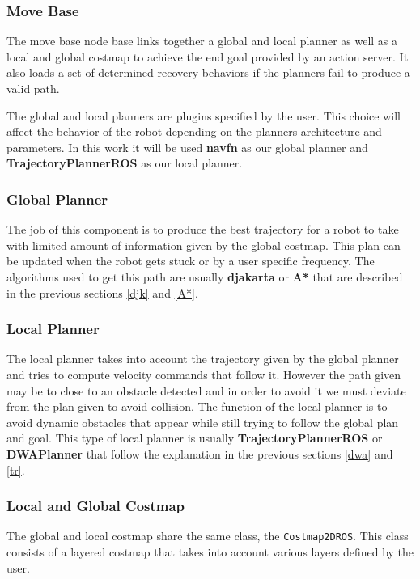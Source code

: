 \subsubsection{Move Base}

The move base node base links together a global and local planner as well as a local and global costmap to achieve the end goal provided by an action server. It also loads a set of determined recovery behaviors if the planners fail to produce a valid path. 

The global and local planners are plugins specified by the user. This choice will affect the behavior of the robot depending on the planners architecture and parameters. In this work it will be used \textbf{navfn} as our global planner and \textbf{TrajectoryPlannerROS} as our local planner.

\subsubsection{Global Planner}
 
The job of this component is to produce the best trajectory for a robot to take with limited amount of information given by the global costmap.
This plan can be updated when the robot gets stuck or by a user specific frequency. The algorithms used to get this path are usually \textbf{djakarta} or \textbf{A*} that are described in the previous sections \ref{djk} and \ref{A*}.

\subsubsection{Local Planner}
The local planner takes into account the trajectory given by the global planner and tries to compute velocity commands that follow it. However the path given may be to close to an obstacle detected and in order to avoid it we must deviate from the plan given to avoid collision. The function of the local planner is to avoid dynamic obstacles that appear while still trying to follow the global plan and goal. This type of local planner is usually \textbf{TrajectoryPlannerROS} or \textbf{DWAPlanner} that follow the explanation in the previous sections \ref{dwa} and \ref{tr}.
\subsubsection{Local and Global Costmap}
The global and local costmap share the same class, the  \texttt{Costmap2DROS}. This class consists of a layered costmap that takes into account various layers defined by the user.

